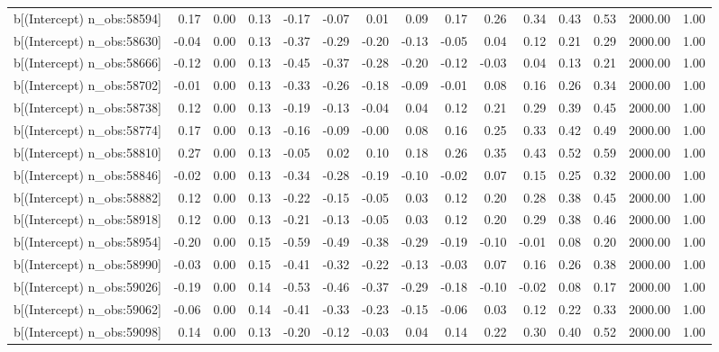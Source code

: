 \begin{table}[ht]
\begin{tabular}{rrrrrrrrrrrrrrr}
  b[(Intercept) n\_obs:58594] & 0.17 & 0.00 & 0.13 & -0.17 & -0.07 & 0.01 & 0.09 & 0.17 & 0.26 & 0.34 & 0.43 & 0.53 & 2000.00 & 1.00 \\ 
  b[(Intercept) n\_obs:58630] & -0.04 & 0.00 & 0.13 & -0.37 & -0.29 & -0.20 & -0.13 & -0.05 & 0.04 & 0.12 & 0.21 & 0.29 & 2000.00 & 1.00 \\ 
  b[(Intercept) n\_obs:58666] & -0.12 & 0.00 & 0.13 & -0.45 & -0.37 & -0.28 & -0.20 & -0.12 & -0.03 & 0.04 & 0.13 & 0.21 & 2000.00 & 1.00 \\ 
  b[(Intercept) n\_obs:58702] & -0.01 & 0.00 & 0.13 & -0.33 & -0.26 & -0.18 & -0.09 & -0.01 & 0.08 & 0.16 & 0.26 & 0.34 & 2000.00 & 1.00 \\ 
  b[(Intercept) n\_obs:58738] & 0.12 & 0.00 & 0.13 & -0.19 & -0.13 & -0.04 & 0.04 & 0.12 & 0.21 & 0.29 & 0.39 & 0.45 & 2000.00 & 1.00 \\ 
  b[(Intercept) n\_obs:58774] & 0.17 & 0.00 & 0.13 & -0.16 & -0.09 & -0.00 & 0.08 & 0.16 & 0.25 & 0.33 & 0.42 & 0.49 & 2000.00 & 1.00 \\ 
  b[(Intercept) n\_obs:58810] & 0.27 & 0.00 & 0.13 & -0.05 & 0.02 & 0.10 & 0.18 & 0.26 & 0.35 & 0.43 & 0.52 & 0.59 & 2000.00 & 1.00 \\ 
  b[(Intercept) n\_obs:58846] & -0.02 & 0.00 & 0.13 & -0.34 & -0.28 & -0.19 & -0.10 & -0.02 & 0.07 & 0.15 & 0.25 & 0.32 & 2000.00 & 1.00 \\ 
  b[(Intercept) n\_obs:58882] & 0.12 & 0.00 & 0.13 & -0.22 & -0.15 & -0.05 & 0.03 & 0.12 & 0.20 & 0.28 & 0.38 & 0.45 & 2000.00 & 1.00 \\ 
  b[(Intercept) n\_obs:58918] & 0.12 & 0.00 & 0.13 & -0.21 & -0.13 & -0.05 & 0.03 & 0.12 & 0.20 & 0.29 & 0.38 & 0.46 & 2000.00 & 1.00 \\ 
  b[(Intercept) n\_obs:58954] & -0.20 & 0.00 & 0.15 & -0.59 & -0.49 & -0.38 & -0.29 & -0.19 & -0.10 & -0.01 & 0.08 & 0.20 & 2000.00 & 1.00 \\ 
  b[(Intercept) n\_obs:58990] & -0.03 & 0.00 & 0.15 & -0.41 & -0.32 & -0.22 & -0.13 & -0.03 & 0.07 & 0.16 & 0.26 & 0.38 & 2000.00 & 1.00 \\ 
  b[(Intercept) n\_obs:59026] & -0.19 & 0.00 & 0.14 & -0.53 & -0.46 & -0.37 & -0.29 & -0.18 & -0.10 & -0.02 & 0.08 & 0.17 & 2000.00 & 1.00 \\ 
  b[(Intercept) n\_obs:59062] & -0.06 & 0.00 & 0.14 & -0.41 & -0.33 & -0.23 & -0.15 & -0.06 & 0.03 & 0.12 & 0.22 & 0.33 & 2000.00 & 1.00 \\ 
  b[(Intercept) n\_obs:59098] & 0.14 & 0.00 & 0.13 & -0.20 & -0.12 & -0.03 & 0.04 & 0.14 & 0.22 & 0.30 & 0.40 & 0.52 & 2000.00 & 1.00 \\ 

\end{tabular}
\end{table}
